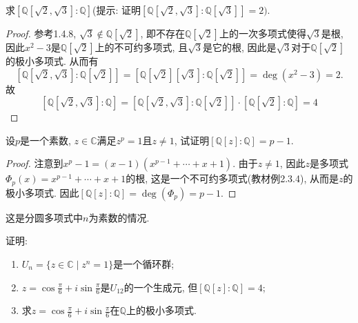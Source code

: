 \documentclass{../solutions-cn}
\begin{document}
\begin{exercise}[习题3.1.4]
    求$\left[\mathbb{Q}[\sqrt2, \sqrt3]:\mathbb{Q}\right]$(提示: 证明$\left[\mathbb{Q}[\sqrt2, \sqrt3]:\mathbb{Q}[\sqrt3]\right] = 2)$.
\end{exercise}

\begin{proof}
    参考1.4.8, $\sqrt{3} \notin \mathbb{Q}[\sqrt{2}]$, 即不存在$\mathbb{Q}[\sqrt{2}]$上的一次多项式使得$\sqrt{3}$是根, 因此$x^2 - 3$是$\mathbb{Q}[\sqrt{2}]$上的不可约多项式, 且$\sqrt{3}$是它的根, 因此是$\sqrt{3}$对于$\mathbb{Q}[\sqrt{2}]$的极小多项式. 从而有
    \[
        \left[\mathbb{Q}[\sqrt{2}, \sqrt{3}]:\mathbb{Q}[\sqrt{2}]\right] = \left[\mathbb{Q}[\sqrt{2}][\sqrt{3}]:\mathbb{Q}[\sqrt{2}]\right] = \deg(x^2 - 3) = 2.
    \]
    故
    \[
        \left[\mathbb{Q}[\sqrt{2}, \sqrt{3}]:\mathbb{Q}\right] = \left[\mathbb{Q}[\sqrt{2}, \sqrt{3}]:\mathbb{Q}[\sqrt{2}]\right] \cdot \left[\mathbb{Q}[\sqrt{2}]:\mathbb{Q}\right] = 4
    \]
\end{proof}

\begin{exercise}[习题3.1.5]
    设$p$是一个素数, $z \in \mathbb{C}$满足$z^p = 1$且$z \neq 1$, 试证明$[\mathbb{Q}[z]:\mathbb{Q}] = p - 1$.
\end{exercise}

\begin{proof}
    注意到$x^p - 1 = (x - 1)(x^{p - 1} + \cdots + x + 1)$. 由于$z \neq 1$, 因此$z$是多项式$\Phi_p(x) = x^{p - 1} + \cdots + x + 1$的根, 这是一个不可约多项式(教材例2.3.4), 从而是$z$的极小多项式. 因此$[\mathbb{Q}[z]:\mathbb{Q}] = \deg(\Phi_p) = p - 1$.
\end{proof}

\begin{remark}
    这是分圆多项式中$n$为素数的情况.
\end{remark}

\begin{exercise}[习题3.1.6]
    证明:
    \begin{enumerate}[(1)]
        \item $U_n = \{z \in \mathbb{C} \mid z^n = 1\}$是一个循环群;
        \item $z = \cos \frac\pi6 + i\sin \frac\pi6$是$U_{12}$的一个生成元, 但$[\mathbb{Q}[z]:\mathbb{Q}] = 4$;
        \item 求$z = \cos \frac\pi6 + i\sin \frac\pi6$在$\mathbb{Q}$上的极小多项式.
    \end{enumerate}
\end{exercise}
\end{document}
